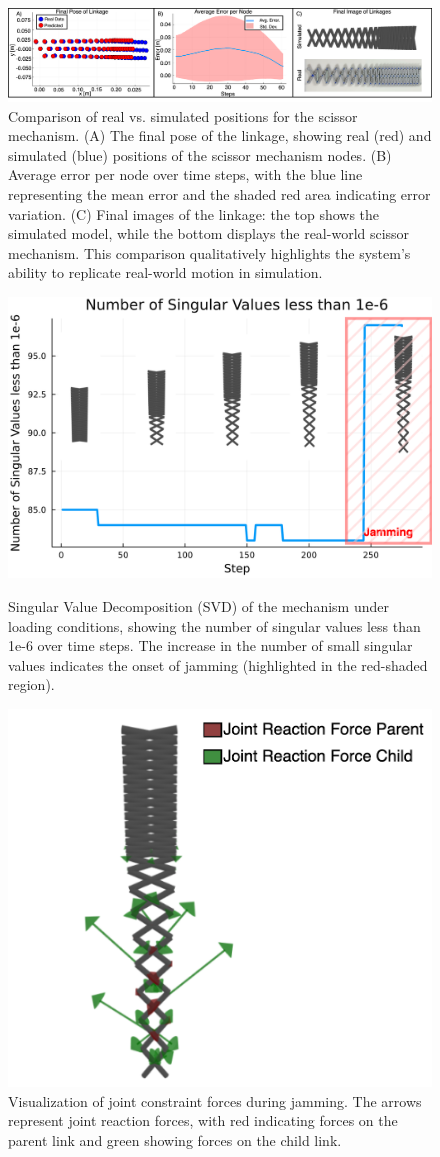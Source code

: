 \begin{figure}
    \centering
    \includegraphics[width=\linewidth]{Figures/hardware_to_simulation_results.drawio.png}
    \caption{Comparison of real vs. simulated positions for the scissor mechanism. (A) The final pose of the linkage, showing real (red) and simulated (blue) positions of the scissor mechanism nodes. (B) Average error per node over time steps, with the blue line representing the mean error and the shaded red area indicating error variation. (C) Final images of the linkage: the top shows the simulated model, while the bottom displays the real-world scissor mechanism. This comparison qualitatively highlights the system’s ability to replicate real-world motion in simulation.}
    \label{fig:real_results}
\end{figure}
\begin{figure}
    \centering
    \includegraphics[width=0.6\linewidth]{Figures/Jamming_svds.drawio.png}
    \caption{Singular Value Decomposition (SVD) of the mechanism under loading conditions, showing the number of singular values less than 1e-6 over time steps. The increase in the number of small singular values indicates the onset of jamming (highlighted in the red-shaded region).}
    \label{fig:jamming-detection}
      \includegraphics[width=0.6\linewidth]{Figures/joint_reaction_forces.drawio.png}
    \caption{Visualization of joint constraint forces during jamming. The arrows represent joint reaction forces, with red indicating forces on the parent link and green showing forces on the child link. }
    \label{fig:constraint-force}
\end{figure}
